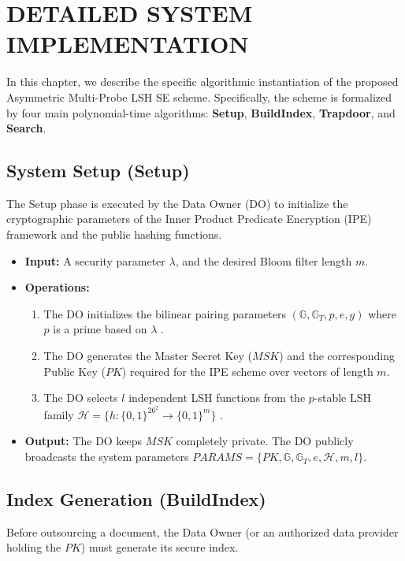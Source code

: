 \chapter{DETAILED SYSTEM IMPLEMENTATION}
\graphicspath{{Chapter4/}}

In this chapter, we describe the specific algorithmic instantiation of the proposed Asymmetric Multi-Probe LSH SE scheme. Specifically, the scheme is formalized by four main polynomial-time algorithms: \textbf{Setup}, \textbf{BuildIndex}, \textbf{Trapdoor}, and \textbf{Search}.

\section{System Setup (Setup)}
The Setup phase is executed by the Data Owner (DO) to initialize the cryptographic parameters of the Inner Product Predicate Encryption (IPE) framework and the public hashing functions.

\begin{itemize}
    \item \textbf{Input:} A security parameter $\lambda$, and the desired Bloom filter length $m$.
    \item \textbf{Operations:}
    \begin{enumerate}
        \item The DO initializes the bilinear pairing parameters $(\mathbb{G}, \mathbb{G}_T, p, e, g)$ where $p$ is a prime based on $\lambda$ \cite{shen2009predicate}.
        \item The DO generates the Master Secret Key ($MSK$) and the corresponding Public Key ($PK$) required for the IPE scheme over vectors of length $m$. 
        \item The DO selects $l$ independent LSH functions from the $p$-stable LSH family $\mathcal{H} = \{h: \{0,1\}^{26^2} \rightarrow \{0,1\}^m\}$ \cite{datar2004locality}.%
    \end{enumerate}
    \item \textbf{Output:} The DO keeps $MSK$ completely private. The DO publicly broadcasts the system parameters $PARAMS = \{PK, \mathbb{G}, \mathbb{G}_T, e, \mathcal{H}, m, l\}$.
\end{itemize}

\section{Index Generation (BuildIndex)}
Before outsourcing a document, the Data Owner (or an authorized data provider holding the $PK$) must generate its secure index. 

